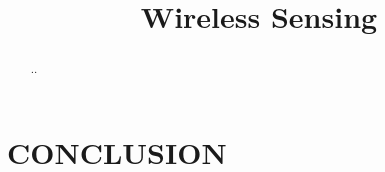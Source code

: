 \documentclass[conference]{IEEEtran}
\begin{document}
%
\title{Wireless Sensing}



\maketitle

\begin{abstract}
..
\end{abstract}


\IEEEpeerreviewmaketitle


%







\section{CONCLUSION}\label{sec:8conc}


\footnotesize


\end{document}
